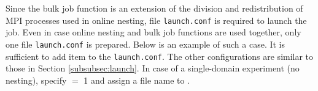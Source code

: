 Since the bulk job function is an extension of the division and redistribution of MPI processes used in online nesting, file \verb|launch.conf| is required to launch the job. Even in case online nesting and bulk job functions are used together, only one file \verb|launch.conf| is prepared.
Below is an example of such a case.
It is sufficient to add item  to the \verb|launch.conf|. The other configurations are similar to those in Section \ref{subsubsec:launch}. In case of a single-domain experiment (no nesting), specify  $=$ 1 and assign a file name to .

